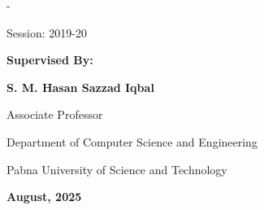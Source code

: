 \begin{titlingpage}
\begin{SingleSpace}
\begin{adjustwidth*}{\unitlength}{-\unitlength}
\begin{center}
Session: 2019-20

\vspace{1cm}

{\textbf{Supervised By:}}

{\textbf{S. M. Hasan Sazzad Iqbal}}

Associate Professor

Department of Computer Science and Engineering

Pabna University of Science and Technology

\vspace{1cm}

{\textbf{August, 2025 }}

\end{center}



\end{adjustwidth*}
\end{SingleSpace}
\end{titlingpage}